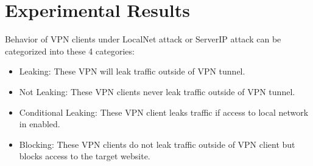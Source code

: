 \documentclass[letterpaper,11pt]{article}
\begin{document}
\section{Experimental Results}
Behavior of VPN clients under LocalNet attack or ServerIP attack can be categorized into these 4 categories:
\begin{itemize}
	\item Leaking: These VPN will leak traffic outside of VPN tunnel.
	\item Not Leaking: These VPN clients never leak traffic outside of VPN tunnel.
	\item Conditional Leaking: These VPN client leaks traffic if access to local network in enabled.
	\item Blocking: These VPN clients do not leak traffic outside of VPN client but blocks access to the target website.
\end{itemize}
\end{document}
